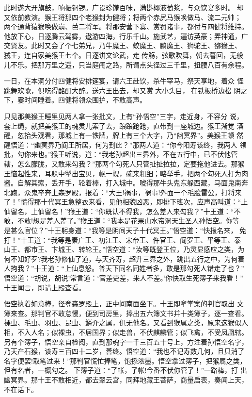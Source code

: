 此时遂大开旗鼓，响振铜锣。广设珍馐百味，满斟椰液萄浆，与众饮宴多时。
却又依前教演。猴王将那四个老猴封为健将；将两个赤尻马猴唤做马、流二元帅；
两个通背猿猴唤做崩、芭二将军。将那安营下寨、赏罚诸事，都付与四健将维持。
他放下心，日逐腾云驾雾，遨游四海，行乐千山。施武艺，遍访英豪；弄神通，广
交贤友。此时又会了个七弟兄，乃牛魔王、蛟魔王、鹏魔王、狮驼王、猕猴王、
狨王，连自家美猴王七个。日逐讲文论武，走传觞，弦歌吹舞，朝去暮回，无般
儿不乐。把那万里之遥，只当庭闱之路，所谓点头径过三千里，扭腰八百有余程。

一日，在本洞分付四健将安排筵宴，请六王赴饮，杀牛宰马，祭天享地，着众
怪跳舞欢歌，俱吃得酩酊大醉。送六王出去，却又赏大小头目，在铁板桥边松
阴之下，霎时间睡着。四健将领众围护，不敢高声。

只见那美猴王睡里见两人拿一张批文，上有“孙悟空”三字，走近身，不容分
说，套上绳，就把美猴王的魂灵儿索了去，踉踉跄跄，直带到一座城边。猴王渐觉
酒醒，忽抬头观看，那城上有一铁牌，牌上有三个大字，乃“幽冥界”。美猴王顿
然醒悟道：“幽冥界乃阎王所居，何为到此？”那两人道：“你今阳寿该终，我两人
领批，勾你来也。”猴王听说，道：“我老孙超出三界外，不在五行中，已不伏他管
辖，怎么朦胧，又敢来勾我？”那两个勾死人只管扯扯拉拉，定要拖他进去。那猴
王恼起性来，耳躲中掣出宝贝，幌一幌，碗来粗细；略举手，把两个勾死人打为肉
酱。自解其索，丢开手，轮着棒，打入城中。唬得那牛头鬼东躲西藏，马面鬼南奔
北跑，众鬼卒奔上森罗殿，报着：“大王!祸事，祸事!外面一个毛脸雷公，打将来
了！”慌得那十代冥王急整衣来看，见他相貌凶恶，即排下班次，应声高叫道：“上
仙留名，上仙留名！”猴王道：“你既认不得我，怎么差人来勾我？”十王道：“不
敢，不敢!想是差人差了。”猴王道：“我本是花果山水帘洞天生圣人孙悟空。你等
是甚么官位？”十王躬身道：“我等是阴间天子十代冥王。”悟空道：“快报名来，
免打！”十王道：“我等是秦广王、初江王、宋帝王、仵官王、阎罗王、平等王、泰
山王、都市王、卞城王、转轮王。”悟空道：“汝等既登王位，乃灵显感应之类，为
何不知好歹?我老孙修仙了道，与天齐寿，超升三界之外，跳出五行之中，为何着
人拘我？”十王道：“上仙息怒。普天下同名同姓者多，敢是那勾死人错走了也？”
悟空道：“胡说，胡说!常言道：‘官差吏差，来人不差。’你快取生死簿子来我看！”
十王闻言，即请上殿查看。

悟空执着如意棒，径登森罗殿上，正中间南面坐下。十王即拿掌案的判官取出
文簿来查。那判官不敢怠慢，便到司房里，捧出五六簿文书并十类簿子，逐一查看。
裸虫、毛虫、羽虫、昆虫、鳞介之属，俱无他名。又看到猴属之类，原来这猴似人
相，不入人名；似裸虫，不居国界；似走兽，不伏麒麟管；似飞禽，不受凤凰辖。
另有个簿子，悟空亲自检阅，直到那魂字一千三百五十号上，方注着孙悟空名字，
乃天产石猴，该寿三百四十二岁，善终。悟空道：“我也不记寿数几何，且只消了
名字便罢!取笔过来！”那判官慌忙捧笔，饱掭浓墨。悟空拿过簿子，把猴属之类，
但有名者，一概勾之。下簿子道：“了帐，了帐!今番不伏你管了！”一路棒，打
出幽冥界。那十王不敢相近，都去翠云宫，同拜地藏王菩萨，商量启表，奏闻上天，
不在话下。

